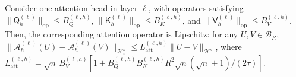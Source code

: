\begin{lemma}
\label{lem:functional-attention-Lipschitz}
Consider one attention head in layer \(\ell\), with operators satisfying \(\|\mathsf Q_h^{(\ell)}\|_{\mathrm{op}}\leqslant B_Q^{(\ell,h)}\), \(\|\mathsf K_h^{(\ell)}\|_{\mathrm{op}}\leqslant B_K^{(\ell,h)}\), and \(\|\mathsf V_h^{(\ell)}\|_{\mathrm{op}}\leqslant B_V^{(\ell,h)}\). Then, the corresponding attention operator is Lipschitz: for any \(U,V \in \mathcal B_R\), \(\|\mathcal A_h^{(\ell)}(U)-\mathcal A_h^{(\ell)}(V)\|_{\mathcal H_v^n}\leqslant L_{\mathrm{att}}^{(\ell,h)}\|U-V\|_{\mathcal H^n}\), where \(L_{\mathrm{att}}^{(\ell,h)}=\sqrt n\,B_V^{(\ell,h)}\left[1+{B_Q^{(\ell,h)}B_K^{(\ell,h)}R^2\sqrt n(\sqrt n+1)}/{(2\tau)}\right]\).
\end{lemma}

